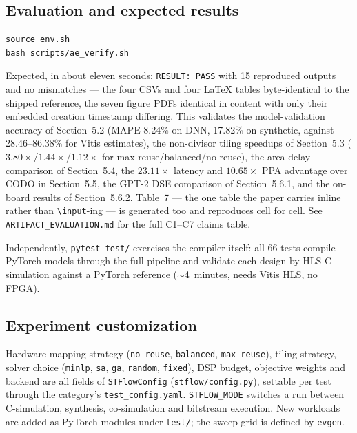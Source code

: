 \subsection{Evaluation and expected results}

\begin{verbatim}
source env.sh
bash scripts/ae_verify.sh
\end{verbatim}

Expected, in about eleven seconds: \texttt{RESULT: PASS} with 15 reproduced outputs and
no mismatches --- the four CSVs and four \LaTeX{} tables byte-identical to the shipped
reference, the seven figure PDFs identical in content with only their embedded creation
timestamp differing. This validates the model-validation accuracy of
Section~5.2 (MAPE 8.24\% on DNN, 17.82\% on synthetic, against 28.46--86.38\% for Vitis
estimates), the non-divisor tiling speedups of Section~5.3
($3.80\times$/$1.44\times$/$1.12\times$ for max-reuse/balanced/no-reuse), the area-delay
comparison of Section~5.4, the $23.11\times$ latency and $10.65\times$ PPA advantage over
CODO in Section~5.5, the GPT-2 DSE comparison of Section~5.6.1, and the on-board results
of Section~5.6.2. Table~7 --- the one table the paper carries inline rather than
\texttt{\textbackslash input}-ing --- is generated too and reproduces cell for cell. See
\texttt{ARTIFACT\_EVALUATION.md} for the full C1--C7 claims table.

Independently, \texttt{pytest test/} exercises the compiler itself: all 66 tests compile
PyTorch models through the full pipeline and validate each design by HLS C-simulation
against a PyTorch reference ($\sim$4~minutes, needs Vitis HLS, no FPGA).

\subsection{Experiment customization}

Hardware mapping strategy (\texttt{no\_reuse}, \texttt{balanced}, \texttt{max\_reuse}),
tiling strategy, solver choice (\texttt{minlp}, \texttt{sa}, \texttt{ga},
\texttt{random}, \texttt{fixed}), DSP budget, objective weights and backend are all
fields of \texttt{STFlowConfig} (\texttt{stflow/config.py}), settable per test through
the category's \texttt{test\_config.yaml}. \texttt{STFLOW\_MODE} switches a run between
C-simulation, synthesis, co-simulation and bitstream execution. New workloads are added
as PyTorch modules under \texttt{test/}; the sweep grid is defined by \texttt{evgen}.

